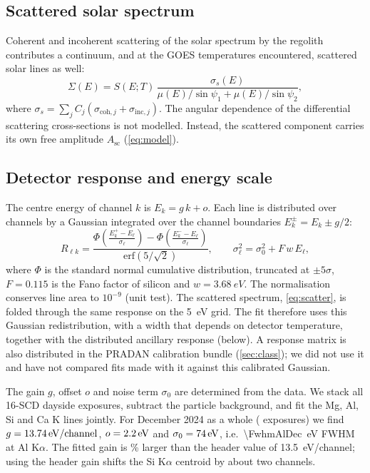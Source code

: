 \subsection{Scattered solar spectrum}\label{sec:scatter}
Coherent and incoherent scattering of the solar spectrum by the regolith contributes a continuum, and at the GOES temperatures encountered, scattered solar lines as well:
\begin{equation}
\Sigma(E) = S(E;T)\,\frac{\sigma_s(E)}{\mu(E)/\sin\psi_1 + \mu(E)/\sin\psi_2},
\label{eq:scatter}
\end{equation}
where $\sigma_s=\sum_j C_j(\sigma_{\mathrm{coh},j}+\sigma_{\mathrm{inc},j})$. The angular dependence of the differential scattering cross-sections is not modelled. Instead, the scattered component carries its own free amplitude $A_\mathrm{sc}$ (\cref{eq:model}).

\subsection{Detector response and energy scale}\label{sec:detector}\label{sec:calib}
The centre energy of channel $k$ is $E_k=g\,k+o$. Each line is distributed over channels by a Gaussian integrated over the channel boundaries $E_k^\pm=E_k\pm g/2$:
\begin{equation}
R_{\ell k} = \frac{\Phi\!\left(\frac{E_k^+-E_\ell}{\sigma_\ell}\right)-\Phi\!\left(\frac{E_k^--E_\ell}{\sigma_\ell}\right)}{\mathrm{erf}(5/\sqrt{2})},
\qquad \sigma_\ell^2=\sigma_0^2+F\,w\,E_\ell ,
\label{eq:response}
\end{equation}
where $\Phi$ is the standard normal cumulative distribution, truncated at $\pm5\sigma$, $F=0.115$ is the Fano factor of silicon and $w=\SI{3.68}{eV}$. The normalisation conserves line area to $10^{-9}$ (unit test). The scattered spectrum, \cref{eq:scatter}, is folded through the same response on the \SI{5}{eV} grid. The fit therefore uses this Gaussian redistribution, with a width that depends on detector temperature, together with the distributed ancillary response (below). A response matrix is also distributed in the PRADAN calibration bundle (\cref{sec:class}); we did not use it and have not compared fits made with it against this calibrated Gaussian.

The gain $g$, offset $o$ and noise term $\sigma_0$ are determined from the data. We stack all 16-SCD dayside exposures, subtract the particle background, and fit the Mg, Al, Si and Ca K lines jointly. For December 2024 as a whole (\NStackDec{} exposures) we find $g=\SI{13.74}{eV/channel}$, $o=\SI{2.2}{eV}$ and $\sigma_0=\SI{74}{eV}$, i.e.\ \SI{\FwhmAlDec}{eV} FWHM at Al K$\alpha$. The fitted gain is \GainPctDec\% larger than the header value of \SI{13.5}{eV/channel}; using the header gain shifts the Si K$\alpha$ centroid by about two channels.

